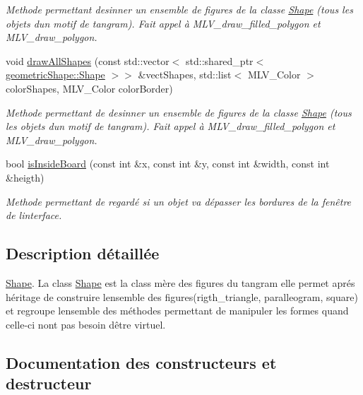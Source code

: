 \begin{DoxyCompactItemize}
\begin{DoxyCompactList}\small\item\em Methode permettant desinner un ensemble de figures de la classe \hyperlink{classgeometric_shape_1_1_shape}{Shape} (tous les objets d\textquotesingle{}un motif de tangram). Fait appel à M\+L\+V\+\_\+draw\+\_\+filled\+\_\+polygon et M\+L\+V\+\_\+draw\+\_\+polygon. \end{DoxyCompactList}\item 
void \hyperlink{classgeometric_shape_1_1_shape_a9bf1440d1bc82b601deaa13c43d70041}{draw\+All\+Shapes} (const std\+::vector$<$ std\+::shared\+\_\+ptr$<$ \hyperlink{classgeometric_shape_1_1_shape}{geometric\+Shape\+::\+Shape} $>$$>$ \&vect\+Shapes, std\+::list$<$ M\+L\+V\+\_\+\+Color $>$ color\+Shapes, M\+L\+V\+\_\+\+Color color\+Border)
\begin{DoxyCompactList}\small\item\em Methode permettant de desinner un ensemble de figures de la classe \hyperlink{classgeometric_shape_1_1_shape}{Shape} (tous les objets d\textquotesingle{}un motif de tangram). Fait appel à M\+L\+V\+\_\+draw\+\_\+filled\+\_\+polygon et M\+L\+V\+\_\+draw\+\_\+polygon. \end{DoxyCompactList}\item 
bool \hyperlink{classgeometric_shape_1_1_shape_a59332afb2295446dd8b39a3b47bbf9b9}{is\+Inside\+Board} (const int \&x, const int \&y, const int \&width, const int \&heigth)
\begin{DoxyCompactList}\small\item\em Methode permettant de regardé si un objet va dépasser les bordures de la fenêtre de l\textquotesingle{}interface. \end{DoxyCompactList}\end{DoxyCompactItemize}


\subsection{Description détaillée}
\hyperlink{classgeometric_shape_1_1_shape}{Shape}. La class \hyperlink{classgeometric_shape_1_1_shape}{Shape} est la class mère des figures du tangram elle permet aprés héritage de construire l\textquotesingle{}ensemble des figures(rigth\+\_\+triangle, paralleogram, square) et regroupe l\textquotesingle{}ensemble des méthodes permettant de manipuler les formes quand celle-\/ci n\textquotesingle{}ont pas besoin d\textquotesingle{}être virtuel. 

\subsection{Documentation des constructeurs et destructeur}
\mbox{\label{classgeometric_shape_1_1_shape_aa45bec6f55f33a59991f83a1d0843a53}} 

